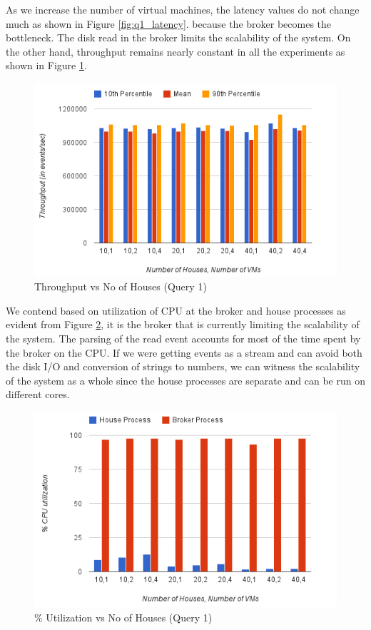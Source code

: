 \vspace*{-0.4cm}
As we increase the number of virtual machines, the latency values do not change much as shown in Figure \ref{fig:q1_latency}.
because the broker becomes the bottleneck.
The disk read in the broker limits the scalability of the system.
On the other hand, throughput remains nearly constant in all the experiments as shown in Figure \ref{fig:q1_throughput}.

\begin{figure}[h]
\begin{center}
	\includegraphics[scale=0.45]{img/q1_throughput}
	\vspace*{-0.4cm}
	\caption{Throughput vs No of Houses (Query 1)\label{fig:q1_throughput}}
\end{center}
\end{figure}

We contend based on utilization of CPU at the broker and house processes as evident from Figure \ref{fig:q1_util}, it is the broker that is currently limiting the scalability of the system.
The parsing of the read event accounts for most of the time spent by the broker on the CPU.
If we were getting events as a stream and can avoid both the disk I/O and conversion of strings to numbers, we can witness the scalability of the system as a whole since the house processes are separate and can be run on different cores.


\begin{figure}[h]
\begin{center}
	\includegraphics[scale=0.5]{img/q1_utilization}
	\vspace*{-0.4cm}
	\caption{\% Utilization vs No of Houses (Query 1)\label{fig:q1_util}}
\end{center}
\end{figure}

